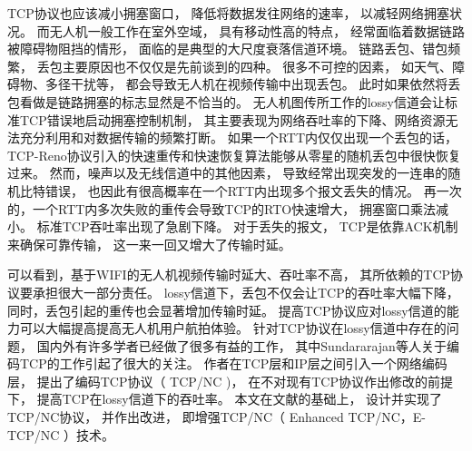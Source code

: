 TCP协议也应该减小拥塞窗口，
降低将数据发往网络的速率，
以减轻网络拥塞状况。
而无人机一般工作在室外空域，
具有移动性高的特点，
经常面临着数据链路被障碍物阻挡的情形，
面临的是典型的大尺度衰落信道环境。
链路丢包、错包频繁，
丢包主要原因也不仅仅是先前谈到的四种。
很多不可控的因素，
如天气、障碍物、多径干扰等，
都会导致无人机在视频传输中出现丢包。
此时如果依然将丢包看做是链路拥塞的标志显然是不恰当的。
无人机图传所工作的lossy信道会让标准TCP错误地启动拥塞控制机制，
其主要表现为网络吞吐率的下降、网络资源无法充分利用和对数据传输的频繁打断。
如果一个RTT内仅仅出现一个丢包的话，
TCP-Reno协议引入的快速重传和快速恢复算法能够从零星的随机丢包中很快恢复过来。
然而，噪声以及无线信道中的其他因素，
导致经常出现突发的一连串的随机比特错误，
也因此有很高概率在一个RTT内出现多个报文丢失的情况。
再一次的，一个RTT内多次失败的重传会导致TCP的RTO快速增大，
拥塞窗口乘法减小。
标准TCP吞吐率出现了急剧下降。
对于丢失的报文，
TCP是依靠ACK机制来确保可靠传输，
这一来一回又增大了传输时延。
\par
可以看到，基于WIFI的无人机视频传输时延大、吞吐率不高，
其所依赖的TCP协议要承担很大一部分责任。
lossy信道下，丢包不仅会让TCP的吞吐率大幅下降，
同时，丢包引起的重传也会显著增加传输时延。
提高TCP协议应对lossy信道的能力可以大幅提高提高无人机用户航拍体验。
针对TCP协议在lossy信道中存在的问题，
国内外有许多学者已经做了很多有益的工作，
其中Sundararajan等人关于编码TCP\textsuperscript{\cite{Sundararajan2009}}的工作引起了很大的关注。
作者在TCP层和IP层之间引入一个网络编码层，
提出了编码TCP协议（ TCP/NC )， 
在不对现有TCP协议作出修改的前提下，
提高TCP在lossy信道下的吞吐率。
本文在文献\cite{Sundararajan2009}的基础上，
设计并实现了TCP/NC协议，
并作出改进，
即增强TCP/NC（ Enhanced TCP/NC，E-TCP/NC ）技术。
